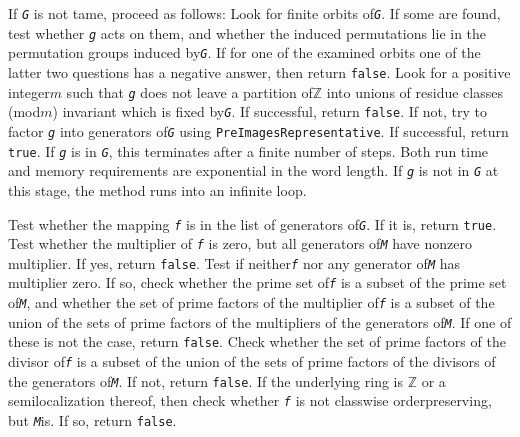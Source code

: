 \documentclass[a4paper,11pt]{report}
\begin{document}
{\begin{description}
 If \mbox{\texttt{\mdseries\slshape G}} is not tame, proceed as follows: Look for finite orbits of{\nobreakspace}\mbox{\texttt{\mdseries\slshape G}}. If some are found, test whether \mbox{\texttt{\mdseries\slshape g}} acts on them, and whether the induced permutations lie in the permutation
groups induced by{\nobreakspace}\mbox{\texttt{\mdseries\slshape G}}. If for one of the examined orbits one of the latter two questions has a
negative answer, then return \texttt{false}. Look for a positive integer{\nobreakspace}$m$ such that \mbox{\texttt{\mdseries\slshape g}} does not leave a partition of{\nobreakspace}{\ensuremath{\mathbb Z}} into
unions of residue classes (mod{\nobreakspace}$m$) invariant which is fixed by{\nobreakspace}\mbox{\texttt{\mdseries\slshape G}}. If successful, return \texttt{false}. If not, try to factor \mbox{\texttt{\mdseries\slshape g}} into generators of{\nobreakspace}\mbox{\texttt{\mdseries\slshape G}} using \texttt{PreImagesRepresentative}. If successful, return \texttt{true}. If \mbox{\texttt{\mdseries\slshape g}} is in \mbox{\texttt{\mdseries\slshape G}}, this terminates after a finite number of steps. Both run time and memory
requirements are exponential in the word length. If \mbox{\texttt{\mdseries\slshape g}} is not in \mbox{\texttt{\mdseries\slshape G}} at this stage, the method runs into an infinite loop. 
\item[{ \texttt{\mbox{\texttt{\mdseries\slshape f}} in \mbox{\texttt{\mdseries\slshape M}}} (membership test for rcwa monoids) }]  Test whether the mapping \mbox{\texttt{\mdseries\slshape f}} is in the list of generators of{\nobreakspace}\mbox{\texttt{\mdseries\slshape G}}. If it is, return \texttt{true}. Test whether the multiplier of \mbox{\texttt{\mdseries\slshape f}} is zero, but all generators of{\nobreakspace}\mbox{\texttt{\mdseries\slshape M}} have nonzero multiplier. If yes, return \texttt{false}. Test if neither{\nobreakspace}\mbox{\texttt{\mdseries\slshape f}} nor any generator of{\nobreakspace}\mbox{\texttt{\mdseries\slshape M}} has multiplier zero. If so, check whether the prime set of{\nobreakspace}\mbox{\texttt{\mdseries\slshape f}} is a subset of the prime set of{\nobreakspace}\mbox{\texttt{\mdseries\slshape M}}, and whether the set of prime factors of the multiplier of{\nobreakspace}\mbox{\texttt{\mdseries\slshape f}} is a subset of the union of the sets of prime factors of the multipliers of
the generators of{\nobreakspace}\mbox{\texttt{\mdseries\slshape M}}. If one of these is not the case, return \texttt{false}. Check whether the set of prime factors of the divisor of{\nobreakspace}\mbox{\texttt{\mdseries\slshape f}} is a subset of the union of the sets of prime factors of the divisors of the
generators of{\nobreakspace}\mbox{\texttt{\mdseries\slshape M}}. If not, return \texttt{false}. If the underlying ring is {\ensuremath{\mathbb Z}} or a semilocalization
thereof, then check whether \mbox{\texttt{\mdseries\slshape f}} is not class\texttt{}wise order\texttt{}preserving, but \mbox{\texttt{\mdseries\slshape M}}{\nobreakspace}is. If so, return \texttt{false}. 


\end{description}}
\end{document}
